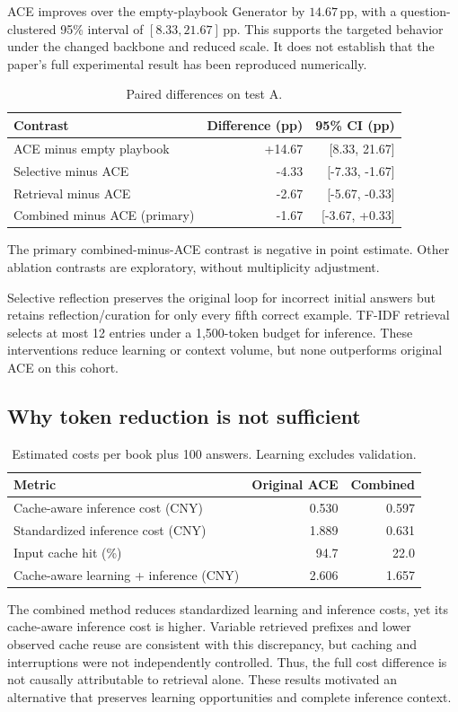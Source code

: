 \documentclass[10pt,a4paper]{article}
\newcommand{\pp}{\,\mathrm{pp}}
\newcommand{\smalltable}{\small\setlength{\tabcolsep}{4pt}}
\begin{document}
ACE improves over the empty-playbook Generator by $14.67\pp$, with a question-clustered 95\% interval of $[8.33,21.67]\pp$. This supports the targeted behavior under the changed backbone and reduced scale. It does not establish that the paper's full experimental result has been reproduced numerically.

\begin{table}[h!]
\centering\smalltable
\begin{tabularx}{\linewidth}{Yrr}
\toprule
Contrast & Difference (pp) & 95\% CI (pp) \\
\midrule
ACE minus empty playbook & +14.67 & [8.33, 21.67] \\
Selective minus ACE & -4.33 & [-7.33, -1.67] \\
Retrieval minus ACE & -2.67 & [-5.67, -0.33] \\
Combined minus ACE (primary) & -1.67 & [-3.67, +0.33] \\
\bottomrule
\end{tabularx}
\caption{Paired differences on test A.}
\end{table}
The primary combined-minus-ACE contrast is negative in point estimate. Other ablation contrasts are exploratory, without multiplicity adjustment.

Selective reflection preserves the original loop for incorrect initial answers but retains reflection/curation for only every fifth correct example. TF-IDF retrieval selects at most 12 entries under a 1,500-token budget for inference. These interventions reduce learning or context volume, but none outperforms original ACE on this cohort.

\subsection{Why token reduction is not sufficient}
\begin{table}[h!]
\centering\smalltable
\begin{tabularx}{\linewidth}{Yrr}
\toprule
Metric & Original ACE & Combined \\
\midrule
Cache-aware inference cost (CNY) & 0.530 & 0.597 \\
Standardized inference cost (CNY) & 1.889 & 0.631 \\
Input cache hit (\%) & 94.7 & 22.0 \\
Cache-aware learning + inference (CNY) & 2.606 & 1.657 \\
\bottomrule
\end{tabularx}
\caption{Estimated costs per book plus 100 answers. Learning excludes validation.}
\end{table}
The combined method reduces standardized learning and inference costs, yet its cache-aware inference cost is higher. Variable retrieved prefixes and lower observed cache reuse are consistent with this discrepancy, but caching and interruptions were not independently controlled. Thus, the full cost difference is not causally attributable to retrieval alone. These results motivated an alternative that preserves learning opportunities and complete inference context.
\end{document}
